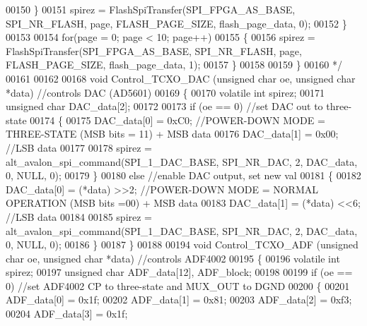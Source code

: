 \begin{DoxyCode}
00150 \textcolor{comment}{        \}}
00151 \textcolor{comment}{        spirez = FlashSpiTransfer(SPI\_FPGA\_AS\_BASE, SPI\_NR\_FLASH, page, FLASH\_PAGE\_SIZE, flash\_page\_data,
       0);}
00152 \textcolor{comment}{    \}}
00153 \textcolor{comment}{}
00154 \textcolor{comment}{    for(page = 0; page < 10; page++)}
00155 \textcolor{comment}{    \{}
00156 \textcolor{comment}{        spirez = FlashSpiTransfer(SPI\_FPGA\_AS\_BASE, SPI\_NR\_FLASH, page, FLASH\_PAGE\_SIZE, flash\_page\_data,
       1);}
00157 \textcolor{comment}{    \}}
00158 \textcolor{comment}{}
00159 \textcolor{comment}{\}}
00160 \textcolor{comment}{*/}
00161 
00162 
00168 \textcolor{keywordtype}{void} Control_TCXO_DAC (\textcolor{keywordtype}{unsigned} \textcolor{keywordtype}{char} oe, \textcolor{keywordtype}{unsigned} \textcolor{keywordtype}{char} *data) \textcolor{comment}{//controls DAC (AD5601)}
00169 \{
00170     \textcolor{keyword}{volatile} \textcolor{keywordtype}{int} spirez;
00171     \textcolor{keywordtype}{unsigned} \textcolor{keywordtype}{char} DAC\_data[2];
00172 
00173     \textcolor{keywordflow}{if} (oe == 0) \textcolor{comment}{//set DAC out to three-state}
00174     \{
00175         DAC\_data[0] = 0xC0; \textcolor{comment}{//POWER-DOWN MODE = THREE-STATE (MSB bits = 11) + MSB data}
00176         DAC\_data[1] = 0x00; \textcolor{comment}{//LSB data}
00177 
00178         spirez = alt_avalon_spi_command(SPI_1_DAC_BASE, SPI_NR_DAC, 2, DAC\_data, 0, NULL, 0);
00179     \}
00180     \textcolor{keywordflow}{else} \textcolor{comment}{//enable DAC output, set new val}
00181     \{
00182         DAC\_data[0] = (*data) >>2; \textcolor{comment}{//POWER-DOWN MODE = NORMAL OPERATION (MSB bits =00) + MSB data}
00183         DAC\_data[1] = (*data) <<6; \textcolor{comment}{//LSB data}
00184 
00185         spirez = alt_avalon_spi_command(SPI_1_DAC_BASE, SPI_NR_DAC, 2, DAC\_data, 0, NULL, 0);
00186     \}
00187 \}
00188 
00194 \textcolor{keywordtype}{void} Control_TCXO_ADF (\textcolor{keywordtype}{unsigned} \textcolor{keywordtype}{char} oe, \textcolor{keywordtype}{unsigned} \textcolor{keywordtype}{char} *data) \textcolor{comment}{//controls ADF4002}
00195 \{
00196     \textcolor{keyword}{volatile} \textcolor{keywordtype}{int} spirez;
00197     \textcolor{keywordtype}{unsigned} \textcolor{keywordtype}{char} ADF\_data[12], ADF\_block;
00198 
00199     \textcolor{keywordflow}{if} (oe == 0) \textcolor{comment}{//set ADF4002 CP to three-state and MUX\_OUT to DGND}
00200     \{
00201         ADF\_data[0] = 0x1f;
00202         ADF\_data[1] = 0x81;
00203         ADF\_data[2] = 0xf3;
00204         ADF\_data[3] = 0x1f;

\end{DoxyCode}
